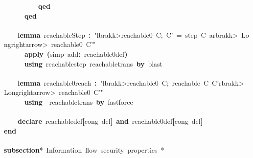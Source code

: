 \documentclass{article}
\newcommand{\syntaxCOMMENTC}[1]{\textcolor[rgb]{0.4,0.0,0.8}{#1}}
\newcommand{\syntaxKEYWORDA}[1]{\textcolor[rgb]{0.0,0.4,0.6}{\textbf{#1}}}
\newcommand{\syntaxKEYWORDB}[1]{\textcolor[rgb]{0.0,0.6,0.4}{\textbf{#1}}}
\newcommand{\syntaxLITERALA}[1]{\textcolor[rgb]{1.0,0.0,0.8}{#1}}
\newcommand{\syntaxOPERATOR}[1]{\textcolor[rgb]{0.0,0.0,0.0}{\textbf{#1}}}
\newcommand{\syntaxCOMMENTC}[1]{\textcolor[rgb]{0.4,0.0,0.8}{#1}}
\newcommand{\syntaxKEYWORDA}[1]{\textcolor[rgb]{0.0,0.4,0.6}{\textbf{#1}}}
\newcommand{\syntaxKEYWORDB}[1]{\textcolor[rgb]{0.0,0.6,0.4}{\textbf{#1}}}
\newcommand{\syntaxLITERALA}[1]{\textcolor[rgb]{1.0,0.0,0.8}{#1}}
\newcommand{\syntaxOPERATOR}[1]{\textcolor[rgb]{0.0,0.0,0.0}{\textbf{#1}}}
\newcommand{\syntaxCOMMENTC}[1]{\textcolor[rgb]{0.4,0.0,0.8}{#1}}
\newcommand{\syntaxKEYWORDA}[1]{\textcolor[rgb]{0.0,0.4,0.6}{\textbf{#1}}}
\newcommand{\syntaxKEYWORDB}[1]{\textcolor[rgb]{0.0,0.6,0.4}{\textbf{#1}}}
\newcommand{\syntaxLITERALA}[1]{\textcolor[rgb]{1.0,0.0,0.8}{#1}}
\newcommand{\syntaxOPERATOR}[1]{\textcolor[rgb]{0.0,0.0,0.0}{\textbf{#1}}}
\newcommand{\syntaxCOMMENTC}[1]{\textcolor[rgb]{0.4,0.0,0.8}{\textbf{#1}}}
\newcommand{\syntaxKEYWORDA}[1]{\textcolor[rgb]{0.0,0.4,0.6}{#1}}
\newcommand{\syntaxKEYWORDB}[1]{\textcolor[rgb]{0.0,0.6,0.4}{#1}}
\newcommand{\syntaxLITERALA}[1]{\textcolor[rgb]{1.0,0.0,0.8}{\textbf{#1}}}
\newcommand{\syntaxOPERATOR}[1]{\textcolor[rgb]{0.0,0.0,0.0}{#1}}
\newcommand{\syntaxCOMMENTC}[1]{\textcolor[rgb]{0.4,0.0,0.8}{#1}}
\newcommand{\syntaxKEYWORDA}[1]{\textcolor[rgb]{0.0,0.4,0.6}{\textbf{#1}}}
\newcommand{\syntaxKEYWORDB}[1]{\textcolor[rgb]{0.0,0.6,0.4}{\textbf{#1}}}
\newcommand{\syntaxLITERALA}[1]{\textcolor[rgb]{1.0,0.0,0.8}{#1}}
\newcommand{\syntaxOPERATOR}[1]{\textcolor[rgb]{0.0,0.0,0.0}{\textbf{#1}}}
\newcommand{\syntaxCOMMENTC}[1]{\textcolor[rgb]{0.4,0.0,0.8}{#1}}
\newcommand{\syntaxKEYWORDA}[1]{\textcolor[rgb]{0.0,0.4,0.6}{\textbf{#1}}}
\newcommand{\syntaxKEYWORDB}[1]{\textcolor[rgb]{0.0,0.6,0.4}{\textbf{#1}}}
\newcommand{\syntaxLITERALA}[1]{\textcolor[rgb]{1.0,0.0,0.8}{#1}}
\newcommand{\syntaxOPERATOR}[1]{\textcolor[rgb]{0.0,0.0,0.0}{\textbf{#1}}}
\begin{document}
{\ }{\ }{\ }{\ }{\ }{\ }{\ }{\ }{\ }{\ }\syntaxKEYWORDA{qed}\hspace*{\fill}\\
{\ }{\ }{\ }{\ }{\ }{\ }\syntaxKEYWORDA{qed}\hspace*{\fill}\\
\hspace*{\fill}\\
{\ }{\ }{\ }{\ }\syntaxKEYWORDA{lemma}{\ }reachableStep{\ }\syntaxOPERATOR{:}{\ }\syntaxLITERALA{"\<lbrakk>reachable0{\ }C;{\ }C'{\ }={\ }step{\ }C{\ }a\<rbrakk>{\ }\<Longrightarrow>{\ }reachable0{\ }C'"}\hspace*{\fill}\\
{\ }{\ }{\ }{\ }{\ }{\ }\syntaxKEYWORDA{apply}{\ }\syntaxOPERATOR{(}simp{\ }add\syntaxOPERATOR{:}{\ }reachable0\usebox{\underscorebox}def\syntaxOPERATOR{)}\hspace*{\fill}\\
{\ }{\ }{\ }{\ }{\ }{\ }\syntaxKEYWORDA{using}{\ }reachable\usebox{\underscorebox}step{\ }reachable\usebox{\underscorebox}trans{\ }\syntaxKEYWORDA{by}{\ }blast\hspace*{\fill}\\
{\ }{\ }{\ }{\ }\hspace*{\fill}\\
{\ }{\ }{\ }{\ }\syntaxKEYWORDA{lemma}{\ }reachable0\usebox{\underscorebox}reach{\ }\syntaxOPERATOR{:}{\ }\syntaxLITERALA{"\<lbrakk>reachable0{\ }C;{\ }reachable{\ }C{\ }C'\<rbrakk>{\ }\<Longrightarrow>{\ }reachable0{\ }C'"}\hspace*{\fill}\\
{\ }{\ }{\ }{\ }{\ }{\ }\syntaxKEYWORDA{using}{\ }{\ }reachable\usebox{\underscorebox}trans{\ }\syntaxKEYWORDA{by}{\ }fastforce\hspace*{\fill}\\
\hspace*{\fill}\\
{\ }{\ }{\ }{\ }\syntaxKEYWORDA{declare}{\ }reachable\usebox{\underscorebox}def\syntaxOPERATOR{{[}}cong{\ }del\syntaxOPERATOR{{]}}{\ }\syntaxKEYWORDB{and}{\ }reachable0\usebox{\underscorebox}def\syntaxOPERATOR{{[}}cong{\ }del\syntaxOPERATOR{{]}}\hspace*{\fill}\\
\syntaxKEYWORDB{end}\hspace*{\fill}\\
\hspace*{\fill}\\
\syntaxKEYWORDA{subsection}\syntaxCOMMENTC{\usebox{\opencurlybracket}*{\ }Information{\ }flow{\ }security{\ }properties{\ }*\usebox{\closecurlybracket}}\hspace*{\fill}\\
\end{document}
